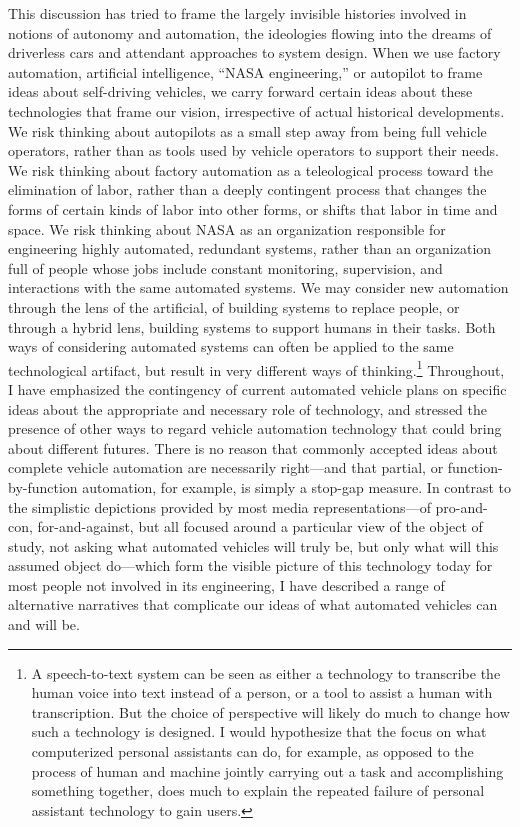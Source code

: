 This discussion has tried to frame the largely invisible histories involved in
notions of autonomy and automation, the ideologies flowing into the
dreams of driverless cars and attendant approaches to system design.
When we use factory automation, artificial intelligence, ``NASA
engineering,'' or autopilot to frame ideas about self-driving
vehicles, we carry forward certain ideas about these technologies that
frame our vision, irrespective of actual historical developments. We risk
thinking about autopilots as a small step away from being full vehicle
operators, rather than as tools used by vehicle operators to support
their needs. We risk thinking about factory automation as a
teleological process toward the elimination of labor, rather than a
deeply contingent process that changes the forms of certain kinds of
labor into other forms, or shifts that labor in time and space. We
risk thinking about NASA as an organization responsible for
engineering highly automated, redundant systems, rather than an
organization full of people whose jobs include constant monitoring,
supervision, and interactions with the same automated systems. We may
consider new automation through the lens of the artificial, of
building systems to replace people, or through a hybrid lens, building
systems to support humans in their tasks. Both ways of considering
automated systems can often be applied to the same technological
artifact, but result in very different ways of thinking.\footnote{A
speech-to-text system can be seen as either a technology to transcribe 
the human voice into text instead of a person, or a tool to assist a
human with transcription. But the choice of perspective will likely do
much to change how such a technology is designed. I would hypothesize that
the focus on what computerized personal assistants can do, for
example, as opposed to the process of human and machine jointly
carrying out a task and accomplishing something together, does much to
explain the repeated failure of personal assistant technology to gain
users.}  Throughout, I have emphasized the contingency of current
automated vehicle plans on specific ideas about the appropriate and
necessary role of technology, and stressed the presence of other ways
to regard vehicle automation technology that could bring about
different futures. There is no reason that commonly accepted ideas
about complete vehicle automation are necessarily right---and that
partial, or function-by-function automation, for example, is simply a
stop-gap measure. In contrast to the simplistic depictions provided by
most media representations---of pro-and-con, for-and-against, but all
focused around a particular view of the object of study, not asking
what automated vehicles will truly be, but only what will this assumed
object do---which form the visible picture of this technology today
for most people not involved in its engineering, I have described a
range of alternative narratives that complicate our ideas of what
automated vehicles can and will be.

